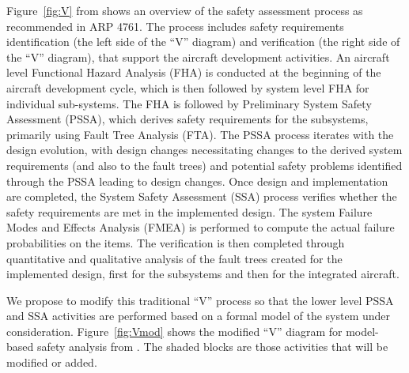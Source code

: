 
Figure~\ref{fig:V} from \cite{Joshi05:SafeComp} shows an overview of the safety assessment
process as recommended in ARP 4761. The process includes safety
requirements identification (the left side of the ``V'' diagram)
and verification (the right side of the ``V'' diagram), that
support the aircraft development activities. An aircraft level
Functional Hazard Analysis (FHA) is conducted at the beginning of
the aircraft development cycle, which is then followed by system
level FHA for individual sub-systems. The FHA is followed by
Preliminary System Safety Assessment (PSSA), which derives safety
requirements for the subsystems, primarily using Fault Tree
Analysis (FTA). The PSSA process iterates with the design
evolution, with design changes necessitating changes to the
derived system requirements (and also to the fault trees) and
potential safety problems identified through the PSSA leading to
design changes. Once design and implementation are completed, the
System Safety Assessment (SSA) process verifies whether the safety
requirements are met in the implemented design. The system Failure
Modes and Effects Analysis (FMEA) is performed to compute the
actual failure probabilities on the items. The verification is
then completed through quantitative and qualitative analysis of
the fault trees created for the implemented design, first for the
subsystems and then for the integrated aircraft.


We propose to modify this traditional ``V'' process so that the
lower level PSSA and SSA activities are performed based on a
formal model of the system under consideration.
Figure~\ref{fig:Vmod} shows the modified ``V'' diagram for
model-based safety analysis from \cite{Joshi05:SafeComp}. The shaded blocks are those
activities that will be modified or added.

